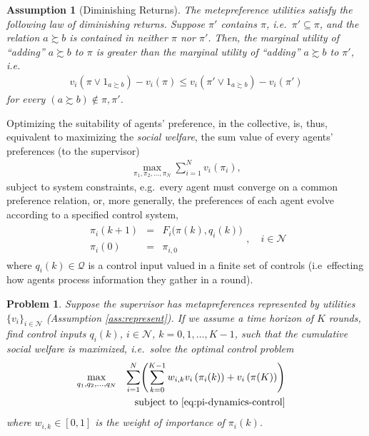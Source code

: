 \documentclass[conference]{ieeeconf}
\newcommand{\N}{\mathcal{N}}
\newcommand{\prefers}{\succsim}
\newcommand{\join}{\vee}
\renewcommand{\leq}{\leqslant}
\newtheorem{assumption}{Assumption}
\newtheorem{problem}{Problem}
\begin{document}
\begin{assumption}[Diminishing Returns]
    The metepreference utilities satisfy the following law of diminishing returns. Suppose $\pi'$ contains $\pi$, i.e.~$\pi' \subseteq \pi$, and the relation $a \prefers b$ is contained in neither $\pi$ nor $\pi'$. Then, the marginal utility of ``adding'' $a \prefers b$ to $\pi$ is greater than the marginal utility of ``adding'' $a \prefers b$ to $\pi'$, i.e.~
    \begin{align}
        v_i(\pi \join 1_{a \prefers b}) - v_i(\pi) \leq v_i(\pi' \join 1_{a \prefers b}) - v_i(\pi')
    \end{align}
    for every $(a \prefers b) \notin \pi, \pi'$.
\end{assumption}

Optimizing the suitability of agents' preference, in the collective, is, thus, equivalent to maximizing the \emph{social welfare}, the sum value of every agents' preferences (to the supervisor)
\begin{align}
    \max_{\pi_1,\pi_2,\dots,\pi_N} \sum_{i=1}^N v_i(\pi_i), \label{eq:dist-opt}
\end{align}
subject to system constraints, e.g.~every agent must converge on a common preference relation, or, more generally, the preferences of each agent evolve according to a specified control system,
\begin{align}
    \begin{aligned}
        \pi_i(k+1) &=& F_i \bigl( \pi(k), q_i(k) \bigr)  \\
        \pi_i(0) &=& \pi_{i,0}
    \end{aligned}, \quad i \in \N
    \label{eq:pi-dynamics-control}
\end{align}
where $q_i(k) \in \mathcal{Q}$ is a control input valued in a finite set of controls (i.e~effecting how agents process information they gather in a round).

\begin{problem} \label{prob:optimal-control}
    Suppose the supervisor has metapreferences represented by utilities $\{v_i\}_{i \in \N}$ (Assumption \ref{ass:represent}). If we assume a time horizon of $K$ rounds, find control inputs $q_i(k)$, $i \in \N$, $k=0,1,\dots,K-1$, such that the cumulative social welfare is maximized, i.e.~solve the optimal control problem
    \begin{align}
    \begin{aligned}
        \max_{q_1, q_2, \dots, q_N} && \sum_{i=1}^N \Biggl( \sum_{k=0}^{K-1} w_{i,k} v_i \left( \pi_i(k) \right) + v_i\left(\pi(K) \right) \Biggr) \\
        && \text{subject to \eqref{eq:pi-dynamics-control}}&& \\
    \end{aligned} \label{eq:optimal-control}
    \end{align}
where $w_{i,k} \in [0,1]$ is the weight of importance of $\pi_i(k)$.
\end{problem}
\end{document}

